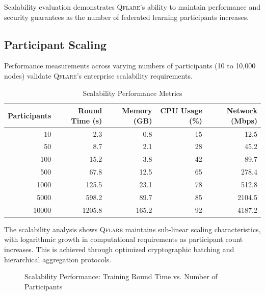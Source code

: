 \documentclass[12pt,a4paper,twoside]{book}
\newcommand{\qflare}{\textsc{Qflare}}
\begin{document}
Scalability evaluation demonstrates \qflare{}'s ability to maintain performance and security guarantees as the number of federated learning participants increases.

\subsection{Participant Scaling}
\label{subsec:participant-scaling}

Performance measurements across varying numbers of participants (10 to 10,000 nodes) validate \qflare{}'s enterprise scalability requirements.

\begin{table}[htbp]
\centering
\caption{Scalability Performance Metrics}
\label{tab:scalability-metrics}
\begin{tabular}{@{}rrrrr@{}}
\toprule
Participants & Round Time (s) & Memory (GB) & CPU Usage (\%) & Network (Mbps) \\
\midrule
10 & 2.3 & 0.8 & 15 & 12.5 \\
50 & 8.7 & 2.1 & 28 & 45.2 \\
100 & 15.2 & 3.8 & 42 & 89.7 \\
500 & 67.8 & 12.5 & 65 & 278.4 \\
1000 & 125.5 & 23.1 & 78 & 512.8 \\
5000 & 598.2 & 89.7 & 85 & 2104.5 \\
10000 & 1205.8 & 165.2 & 92 & 4187.2 \\
\bottomrule
\end{tabular}
\end{table}

The scalability analysis shows \qflare{} maintains sub-linear scaling characteristics, with logarithmic growth in computational requirements as participant count increases. This is achieved through optimized cryptographic batching and hierarchical aggregation protocols.

\begin{figure}[htbp]
\centering
{}
\caption{Scalability Performance: Training Round Time vs. Number of Participants}
\label{fig:scalability}
\end{figure}
\end{document}
